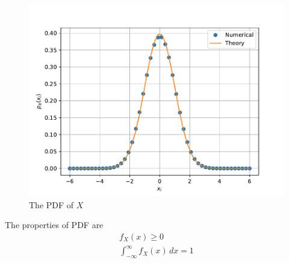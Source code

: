 \documentclass[journal,10pt,twocolumn]{IEEEtran}
\begin{document}
\begin{enumerate}
\begin{figure}[H]
\centering
\includegraphics[width=\columnwidth]{./figs/chapter2/gau_pdf.pdf}
\caption{The PDF of $X$}
\label{fig:gauss_pdf}
\end{figure}

The properties of PDF are
\begin{eqnarray}
	f_X(x) \ge 0\\
	\int_{-\infty}^{\infty} f_X(x) \,dx = 1
\end{eqnarray}


\end{enumerate}
\end{document}
